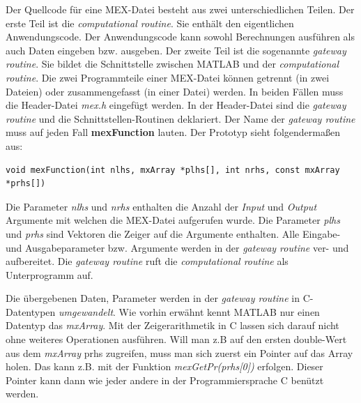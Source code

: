 \documentclass[10pt, bigheadings]{scrartcl}
\begin{document}
Der Quellcode für eine MEX-Datei besteht aus zwei unterschiedlichen
Teilen. Der erste Teil ist die \textit{computational routine}. Sie
enthält den eigentlichen Anwendungscode. Der Anwendungscode kann
sowohl Berechnungen ausführen als auch Daten eingeben bzw. ausgeben.
Der zweite Teil ist die sogenannte \textit{gateway routine}. Sie
bildet die Schnittstelle zwischen MATLAB und der
\textit{computational routine}.
Die zwei Programmteile einer MEX-Datei können getrennt (in zwei Dateien)
oder zusammengefasst (in einer Datei) werden. In beiden Fällen muss
die Header-Datei \textit{mex.h} eingefügt werden. In der Header-Datei
sind die \textit{gateway routine} und die Schnittstellen-Routinen
deklariert. Der Name der \textit{gateway routine} muss auf jeden Fall
\textbf{mexFunction} lauten. Der Prototyp sieht folgendermaßen aus:
\begin{verbatim}
void mexFunction(int nlhs, mxArray *plhs[], int nrhs, const mxArray *prhs[])
\end{verbatim}
Die Parameter \textit{nlhs} und \textit{nrhs} enthalten die Anzahl
der \textit{Input} und \textit{Output} Argumente mit welchen die MEX-Datei
aufgerufen wurde. Die Parameter \textit{plhs} und \textit{prhs} sind
Vektoren die Zeiger auf die Argumente enthalten.
Alle Eingabe- und Ausgabeparameter bzw. Argumente werden in der
\textit{gateway routine} ver- und aufbereitet. Die \textit{gateway routine}
ruft die \textit{computational routine} als Unterprogramm auf.

Die übergebenen Daten, Parameter werden in der
\textit{gateway routine} in C-Datentypen \textit{umgewandelt}.
Wie vorhin erwähnt kennt MATLAB nur einen Datentyp das
\textit{mxArray}. Mit der Zeigerarithmetik in C lassen
sich darauf nicht ohne weiteres Operationen ausführen.
Will man z.B auf den ersten double-Wert aus dem
\textit{mxArray} prhs zugreifen, muss man sich zuerst
ein Pointer auf das Array holen. Das kann z.B. mit
der Funktion \textit{mexGetPr(prhs[0])} erfolgen.
Dieser Pointer kann dann wie jeder andere in der
Programmiersprache C benützt werden.
\end{document}
